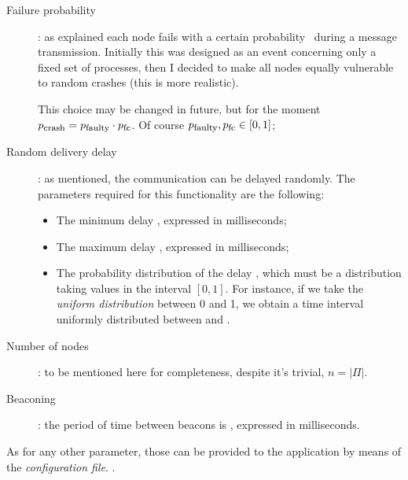 \begin{description}

    \item[Failure probability]:
        as explained each node fails with a certain probability \PCrash\
        during a message transmission. Initially this was designed as an
        event concerning only a fixed set of processes, then I decided to
        make all nodes equally vulnerable to random crashes (this is more
        realistic).

        This choice may be changed in future, but for the moment
        ${p}_{\mbox{\footnotesize{crash}}} = {p}_{\mbox{\footnotesize{faulty}}} \cdot {p}_{\mbox{\footnotesize{fc}}}$. Of course
        ${p}_{\mbox{\footnotesize{faulty}}}, {p}_{\mbox{\footnotesize{fc}}} \in [0, 1]$;

    \item[Random delivery delay]:
        as mentioned, the communication can be delayed randomly. The
        parameters required for this functionality are the following:

        \begin{itemize}

        \item   The minimum delay , expressed in
                milliseconds;

        \item   The maximum delay , expressed
                in milliseconds;

        \item   The probability distribution of the delay
                , which must be a distribution taking
                values in the interval $[0, 1]$. For instance, if we take
                the \emph{uniform distribution} between 0 and 1, we obtain
                a time interval uniformly distributed between
                 and .

        \end{itemize}

    \item[Number of nodes]:
        to be mentioned here for completeness, despite it's trivial, $n =
        \left|\Pi\right|$.

    \item[Beaconing]:
        the period of time between beacons is ,
        expressed in milliseconds.

\end{description}

As for any other parameter, those can be provided to the application by
means of the \emph{configuration file}.
.
